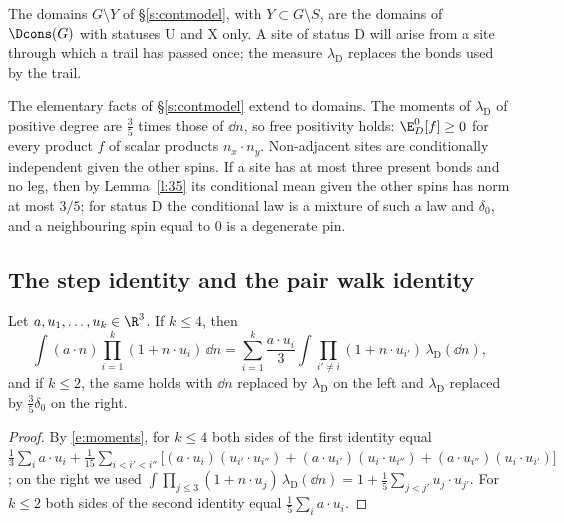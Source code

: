 The domains $G \setminus Y$ of \S\ref{s:contmodel}, with $Y \subset G \setminus S$, are the domains of $\Dcons(G)$ with statuses $\mathrm U$ and $\mathrm X$ only. A site of status $\mathrm D$ will arise from a site through which a trail has passed once; the measure $\lambda_{\mathrm D}$ replaces the bonds used by the trail.

The elementary facts of \S\ref{s:contmodel} extend to domains. The moments of $\lambda_{\mathrm D}$ of positive degree are $\frac35$ times those of $\dd n$, so free positivity holds: $\E^0_D[f] \ge 0$ for every product $f$ of scalar products $n_x \cdot n_y$. Non-adjacent sites are conditionally independent given the other spins. If a site has at most three present bonds and no leg, then by Lemma~\ref{l:35} its conditional mean given the other spins has norm at most $3/5$; for status $\mathrm D$ the conditional law is a mixture of such a law and $\delta_0$, and a neighbouring spin equal to $0$ is a degenerate pin.

\subsection{The step identity and the pair walk identity}\label{s:stepid}

\begin{lemma}\label{l:stepid}
Let $a, u_1, \dots, u_k \in \R^3$. If $k \le 4$, then
\begin{equation*}
\int (a \cdot n) \prod_{i = 1}^k (1 + n \cdot u_i) \, \dd n = \sum_{i = 1}^k \frac{a \cdot u_i}{3} \int \prod_{i' \neq i} (1 + n \cdot u_{i'}) \, \lambda_{\mathrm D}(\dd n),
\end{equation*}
and if $k \le 2$, the same holds with $\dd n$ replaced by $\lambda_{\mathrm D}$ on the left and $\lambda_{\mathrm D}$ replaced by $\frac35 \delta_0$ on the right.
\end{lemma}

\begin{proof}
By \eqref{e:moments}, for $k \le 4$ both sides of the first identity equal $\frac13 \sum_i a \cdot u_i + \frac1{15} \sum_{i < i' < i''} \bigl[ (a \cdot u_i)(u_{i'} \cdot u_{i''}) + (a \cdot u_{i'})(u_i \cdot u_{i''}) + (a \cdot u_{i''})(u_i \cdot u_{i'}) \bigr]$; on the right we used $\int \prod_{j \le 3} (1 + n \cdot u_j) \, \lambda_{\mathrm D}(\dd n) = 1 + \frac15 \sum_{j < j'} u_j \cdot u_{j'}$. For $k \le 2$ both sides of the second identity equal $\frac15 \sum_i a \cdot u_i$.
\end{proof}

